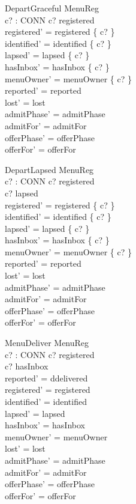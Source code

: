 \documentclass[a4paper,10pt,fleqn]{article}
\begin{document}
\begin{schema}{DepartGraceful}
  \Delta MenuReg \\
  c? : CONN
\where
  c? \in registered \\
  registered' = registered \setminus \{ c? \} \\
  identified' = identified \setminus \{ c? \} \\
  lapsed' = lapsed \setminus \{ c? \} \\
  hasInbox' = hasInbox \setminus \{ c? \} \\
  menuOwner' = menuOwner \setminus \{ c? \} \\
  reported' = reported \\
  lost' = lost \\
  admitPhase' = admitPhase \\
  admitFor' = admitFor \\
  offerPhase' = offerPhase \\
  offerFor' = offerFor
\end{schema}

\begin{schema}{DepartLapsed}
  \Delta MenuReg \\
  c? : CONN
\where
  c? \in registered \\
  c? \in lapsed \\
  registered' = registered \setminus \{ c? \} \\
  identified' = identified \setminus \{ c? \} \\
  lapsed' = lapsed \setminus \{ c? \} \\
  hasInbox' = hasInbox \setminus \{ c? \} \\
  menuOwner' = menuOwner \setminus \{ c? \} \\
  reported' = reported \\
  lost' = lost \\
  admitPhase' = admitPhase \\
  admitFor' = admitFor \\
  offerPhase' = offerPhase \\
  offerFor' = offerFor
\end{schema}

\begin{schema}{MenuDeliver}
  \Delta MenuReg \\
  c? : CONN
\where
  c? \in registered \\
  c? \in hasInbox \\
  reported' = ddelivered \\
  registered' = registered \\
  identified' = identified \\
  lapsed' = lapsed \\
  hasInbox' = hasInbox \\
  menuOwner' = menuOwner \\
  lost' = lost \\
  admitPhase' = admitPhase \\
  admitFor' = admitFor \\
  offerPhase' = offerPhase \\
  offerFor' = offerFor
\end{schema}
\end{document}
